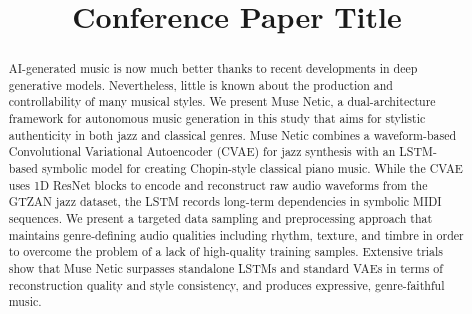 \documentclass[conference]{IEEEtran}
\begin{document}
\title{Conference Paper Title\\}

\author{
\and
{}
\and
{}
\and
{}
\and
{}
}

\maketitle


\begin{abstract}
AI-generated music is now much better thanks to recent developments in deep generative models. Nevertheless, little is known about the production and controllability of many musical styles. We present Muse Netic, a dual-architecture framework for autonomous music generation in this study that aims for stylistic authenticity in both jazz and classical genres. Muse Netic combines a waveform-based Convolutional Variational Autoencoder (CVAE) for jazz synthesis with an LSTM-based symbolic model for creating Chopin-style classical piano music. While the CVAE uses 1D ResNet blocks to encode and reconstruct raw audio waveforms from the GTZAN jazz dataset, the LSTM records long-term dependencies in symbolic MIDI sequences. We present a targeted data sampling and preprocessing approach that maintains genre-defining audio qualities including rhythm, texture, and timbre in order to overcome the problem of a lack of high-quality training samples. Extensive trials show that Muse Netic surpasses standalone LSTMs and standard VAEs in terms of reconstruction quality and style consistency, and produces expressive, genre-faithful music.
\end{abstract}
\end{document}
